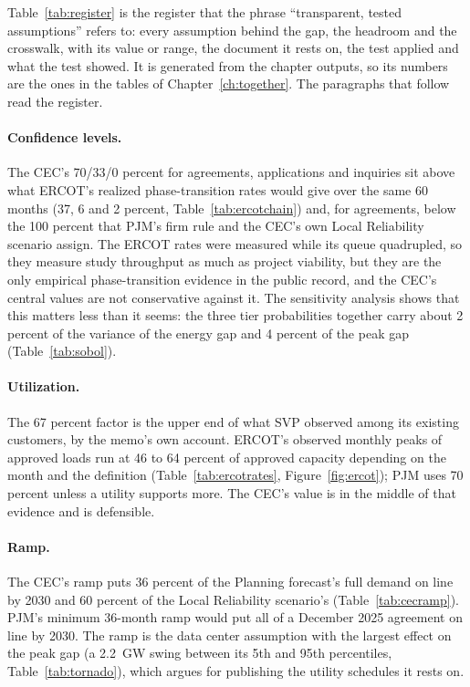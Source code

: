 Table~\ref{tab:register} is the register that the phrase ``transparent, tested assumptions'' refers to: every assumption behind the gap, the headroom and the crosswalk, with its value or range, the document it rests on, the test applied and what the test showed. It is generated from the chapter outputs, so its numbers are the ones in the tables of Chapter~\ref{ch:together}. The paragraphs that follow read the register.

{\scriptsize}

\paragraph{Confidence levels.} The CEC's 70/33/0 percent for agreements, applications and inquiries sit above what ERCOT's realized phase-transition rates would give over the same 60 months (37, 6 and 2 percent, Table~\ref{tab:ercotchain}) and, for agreements, below the 100 percent that PJM's firm rule and the CEC's own Local Reliability scenario assign. The ERCOT rates were measured while its queue quadrupled, so they measure study throughput as much as project viability, but they are the only empirical phase-transition evidence in the public record, and the CEC's central values are not conservative against it. The sensitivity analysis shows that this matters less than it seems: the three tier probabilities together carry about 2 percent of the variance of the energy gap and 4 percent of the peak gap (Table~\ref{tab:sobol}).

\paragraph{Utilization.} The 67 percent factor is the upper end of what SVP observed among its existing customers, by the memo's own account. ERCOT's observed monthly peaks of approved loads run at 46 to 64 percent of approved capacity depending on the month and the definition (Table~\ref{tab:ercotrates}, Figure~\ref{fig:ercot}); PJM uses 70 percent unless a utility supports more. The CEC's value is in the middle of that evidence and is defensible.

\paragraph{Ramp.} The CEC's ramp puts 36 percent of the Planning forecast's full demand on line by 2030 and 60 percent of the Local Reliability scenario's (Table~\ref{tab:cecramp}). PJM's minimum 36-month ramp would put all of a December 2025 agreement on line by 2030. The ramp is the data center assumption with the largest effect on the peak gap (a 2.2~GW swing between its 5th and 95th percentiles, Table~\ref{tab:tornado}), which argues for publishing the utility schedules it rests on.

